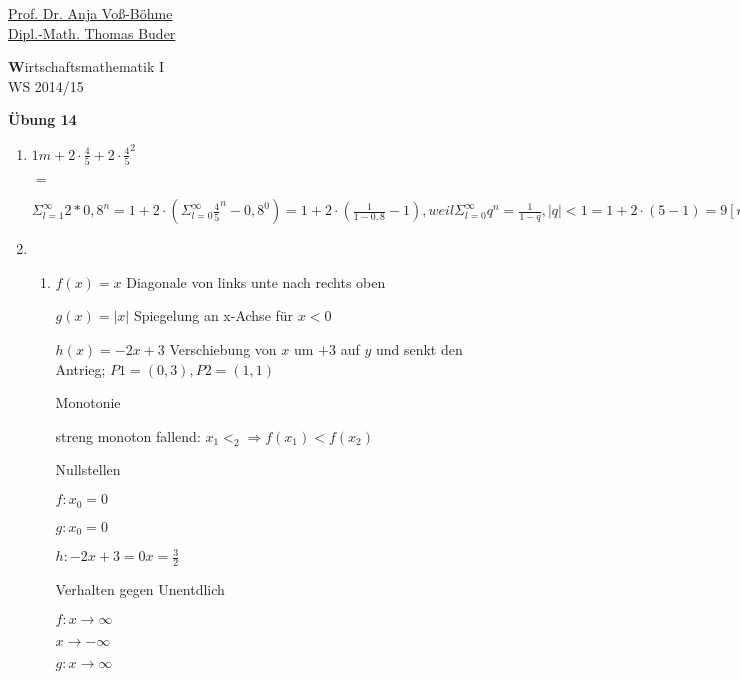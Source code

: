 \documentclass[12pt,a4paper]{scrreprt}
\begin{document}
 
\begin{flushleft}
\href{mailto:anja.voss-boehme@htw-dresden.de}{Prof. Dr. Anja Voß-Böhme} \\
\href{mailto:buder@htw-dresden.de}{Dipl.-Math. Thomas Buder}
\end{flushleft}

\begin{center}{\large\textbf Wirtschaftsmathematik I} \\ WS 2014/15 \end{center}

\begin{center}{\large\textbf{Übung 14}} 
\end{center}


\bigskip

\begin{enumerate}

\item

$
1m + 2 \cdot \frac{4}{5} + 2 \cdot \frac{4}{5}^2
$

$=
$

$\Sigma_{l=1}^{\infty} 2 * 0,8^n
 = 1 + 2 \cdot ( \Sigma_{l=0}^{\infty} \frac{4}{5}^n - 0,8^0 )
= 1 + 2 \cdot ( \frac{1}{1-0,8} - 1 ), weil  \Sigma_{l=0}^{\infty} q^n = \frac{1}{1-q}, |q| < 1
= 1 + 2 \cdot ( 5 - 1 )
= 9 [m]
$


\item

\begin{enumerate}

\item
$f(x) = x$		Diagonale von links unte nach rechts oben

$g(x) = |x|$		Spiegelung an x-Achse für $x<0$

$h(x) = -2x + 3$	Verschiebung von $x$ um $+3$ auf $y$ und senkt den Antrieg; $P1=(0,3), P2=(1,1)$

Monotonie

streng monoton fallend: $x_1 < _2 \Rightarrow f(x_1) < f(x_2)$

Nullstellen

$f: x_0=0$

$g: x_0=0$

$h: -2x+3=0 x= \frac{3}{2}$

Verhalten gegen Unentdlich

$f:	
x \rightarrow \infty$

$x \rightarrow -\infty$

$g:	
x \rightarrow \infty$


\end{enumerate}
\end{enumerate}
\end{document}

